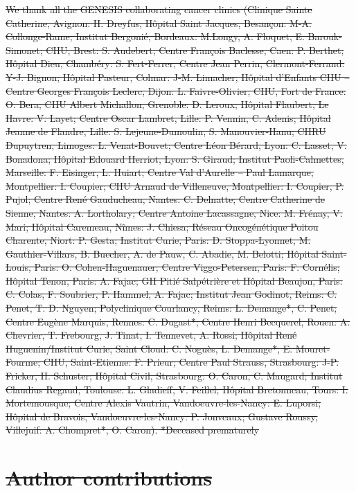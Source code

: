 \documentclass[10pt,letterpaper]{article}
\providecommand{\DIFdeltex}[1]{{\protect\color{red}\sout{#1}}}                      %
\providecommand{\DIFdel}[1]{\texorpdfstring{\DIFdeltex{#1}}{}} %
\begin{document}
\DIFdel{We thank all the GENESIS collaborating cancer clinics (Clinique Sainte Catherine, Avignon: H. Dreyfus; Hôpital Saint Jacques, Besançon: M-A. Collonge-Rame; Institut Bergonié, Bordeaux: M.Longy, A. Floquet, E. Barouk-Simonet; CHU, Brest: S. Audebert; Centre François Baclesse, Caen: P. Berthet; Hôpital Dieu, Chambéry: S. Fert-Ferrer; Centre Jean Perrin, Clermont-Ferrand: Y-J. Bignon; Hôpital Pasteur, Colmar: J-M. Limacher; Hôpital d’Enfants CHU – Centre Georges François Leclerc, Dijon: L. Faivre-Olivier; CHU, Fort de France: O. Bera; CHU Albert Michallon, Grenoble: D. Leroux; Hôpital Flaubert, Le Havre: V. Layet; Centre Oscar Lambret, Lille: P. Vennin, C. Adenis; Hôpital Jeanne de Flandre, Lille: S. Lejeune-Dumoulin, S. Manouvier-Hanu; CHRU Dupuytren, Limoges: L. Venat-Bouvet; Centre Léon Bérard, Lyon: C. Lasset, V. Bonadona; Hôpital Edouard Herriot, Lyon: S. Giraud; Institut Paoli-Calmettes, Marseille: F. Eisinger, L. Huiart; Centre Val d’Aurelle – Paul Lamarque, Montpellier: I. Coupier; CHU Arnaud de Villeneuve, Montpellier: I. Coupier, P. Pujol; Centre René Gauducheau, Nantes: C. Delnatte; Centre Catherine de Sienne, Nantes: A. Lortholary; Centre Antoine Lacassagne, Nice: M. Frénay, V. Mari; Hôpital Caremeau, Nîmes: J. Chiesa; Réseau Oncogénétique Poitou Charente, Niort: P. Gesta; Institut Curie, Paris: D. Stoppa-Lyonnet, M. Gauthier-Villars, B. Buecher, A. de Pauw, C. Abadie, M. Belotti; Hôpital Saint-Louis, Paris: O. Cohen-Haguenauer; Centre Viggo-Petersen, Paris: F. Cornélis; Hôpital Tenon, Paris: A. Fajac; GH Pitié Salpétrière et Hôpital Beaujon, Paris: C. Colas, F. Soubrier, P. Hammel, A. Fajac; Institut Jean Godinot, Reims: C. Penet, T. D. Nguyen; Polyclinique Courlancy, Reims: L. Demange*, C. Penet; Centre Eugène Marquis, Rennes: C. Dugast*; Centre Henri Becquerel, Rouen: A. Chevrier, T. Frebourg, J. Tinat, I. Tennevet, A. Rossi; Hôpital René Huguenin/Institut Curie, Saint Cloud: C. Noguès, L. Demange*, E. Mouret-Fourme; CHU, Saint-Etienne: F. Prieur; Centre Paul Strauss, Strasbourg: J-P. Fricker, H. Schuster; Hôpital Civil, Strasbourg: O. Caron, C. Maugard; Institut Claudius Regaud, Toulouse: L. Gladieff, V. Feillel; Hôpital Bretonneau, Tours: I. Mortemousque; Centre Alexis Vautrin, Vandoeuvre-les-Nancy: E. Luporsi; Hôpital de Bravois, Vandoeuvre-les-Nancy: P. Jonveaux; Gustave Roussy, Villejuif: A. Chompret*, O. Caron).
*Deceased prematurely}%

\section*{\DIFdel{Author contributions}}
\end{document}
